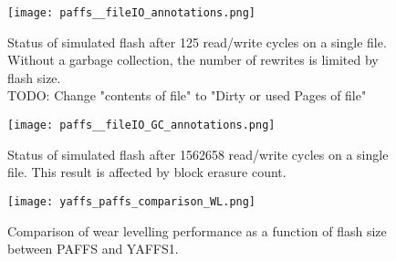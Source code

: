 \begin{figure}[htp]
	\centering\texttt{[image: paffs\_\_fileIO\_annotations.png]}
	\caption{\label{fig:fileIO} Status of simulated flash after 125 read/write cycles on a single file. Without a garbage collection, the number of rewrites is limited by flash size.\\TODO: Change "contents of file" to "Dirty or used Pages of file"}
\end{figure}
\begin{figure}[htp]
	\centering\texttt{[image: paffs\_\_fileIO\_GC\_annotations.png]}
	\caption{\label{fig:fileIO} Status of simulated flash after 1562658 read/write cycles on a single file. This result is affected by block erasure count.}
\end{figure}
\begin{figure}[htp]
	\centering\texttt{[image: yaffs\_paffs\_comparison\_WL.png]}
	\caption{\label{fig:fileIOCompare} Comparison of wear levelling performance as a function of flash size between PAFFS and YAFFS1.}
\end{figure}


\appendix
